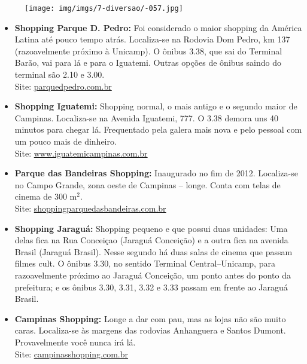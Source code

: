 \begin{figure}[h!]
    \centering
    \texttt{[image: img/imgs/7-diversao/-057.jpg]}
\end{figure}

\begin{itemize}

\item   \textbf{Shopping Parque D. Pedro:} Foi considerado o maior shopping da
        América Latina até pouco tempo atrás. Localiza-se na Rodovia Dom Pedro,
        km 137 (razoavelmente próximo à Unicamp). O ônibus 3.38, que sai do
        Terminal Barão, vai para lá e para o Iguatemi. Outras opções de ônibus
        saindo do terminal são 2.10 e 3.00.
        \\Site: \url{parquedpedro.com.br}

\item   \textbf{Shopping Iguatemi:} Shopping normal, o mais antigo e o segundo
        maior de Campinas. Localiza-se na Avenida Iguatemi, 777. O 3.38 demora
        uns 40 minutos para chegar lá. Frequentado pela galera mais nova e pelo
        pessoal com um pouco mais de dinheiro.
        \\Site: \url{www.iguatemicampinas.com.br}

\item   \textbf{Parque das Bandeiras Shopping:} Inaugurado no fim de 2012.
        Localiza-se no Campo Grande, zona oeste de Campinas -- longe. Conta com
        telas de cinema de 300 m$^{2}$.
        \\Site: \url{shoppingparquedasbandeiras.com.br}

\item   \textbf{Shopping Jaraguá:} Shopping pequeno e que possui duas unidades:
        Uma delas fica na Rua Conceiçao (Jaraguá Conceição) e a outra fica na
        avenida Brasil (Jaraguá Brasil). Nesse segundo há duas salas de cinema
        que passam filmes cult. O ônibus 3.30, no sentido Terminal
        Central--Unicamp, para razoavelmente próximo ao Jaraguá Conceição, um
        ponto antes do ponto da prefeitura; e os ônibus 3.30, 3.31, 3.32 e 3.33
        passam em frente ao Jaraguá Brasil.

\item   \textbf{Campinas Shopping:} Longe a dar com pau, mas as lojas não são
        muito caras. Localiza-se às margens das rodovias Anhanguera e Santos
        Dumont. Provavelmente você nunca irá lá.
        \\Site: \url{campinasshopping.com.br}


\end{itemize}
